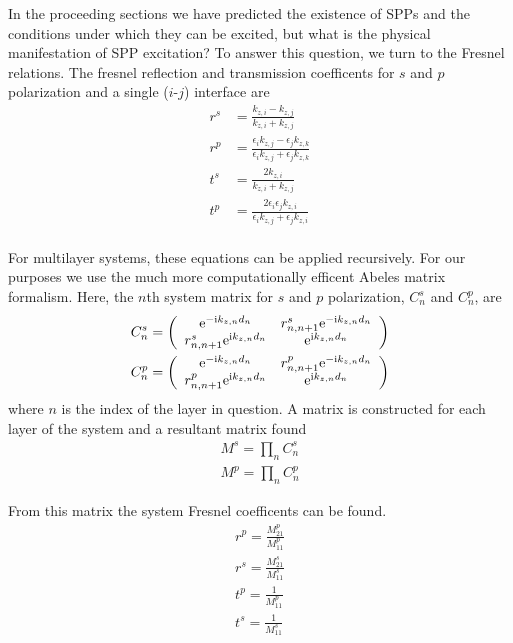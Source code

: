 In the proceeding sections we have predicted the existence of SPPs and the
conditions under which they can be excited, but what is the physical
manifestation of SPP excitation?  To answer this question, we turn to the
Fresnel relations.  The fresnel reflection and transmission coefficents for
$s$ and $p$ polarization and a single ($i$-$j$) interface are
\begin{align}
r^s &= \frac{k_{z,i}-k_{z,j}}{k_{z,i}+k_{z,j}}\\
r^p &= \frac{\epsilon_i k_{z,j} - \epsilon_j k_{z,k}}{\epsilon_i k_{z,j} + \epsilon_j k_{z,k}} \\
t^s &= \frac{2 k_{z,i}}{k_{z,i}+k_{z,j}}\\
t^p &= \frac{2 \epsilon_i \epsilon_j k_{z,i}}{\epsilon_i k_{z,j} + \epsilon_j k_{z,i}}\\
\end{align}

For multilayer systems, these equations can be applied recursively.  For
our purposes we use the much more computationally efficent 
Abeles matrix formalism.  Here, the $n$th system matrix for $s$ and $p$
polarization, $C^s_n$ and $C^p_n$, are
\begin{align}
C^s_n = \left(\begin{array}{cc}
{\mathrm{e}}^{-{\mathrm{i}} k_{z,n} d_n} & r^s_{n,n+1} {\mathrm{e}}^{-{\mathrm{i}} k_{z,n} d_n} \\
r^s_{n,n+1} {\mathrm{e}}^{{\mathrm{i}} k_{z,n} d_n} & {\mathrm{e}}^{{\mathrm{i}} k_{z,n} d_n} 
\end{array}\right)\\
C^p_n = \left(\begin{array}{cc}
{\mathrm{e}}^{-{\mathrm{i}} k_{z,n} d_n} & r^p_{n,n+1} {\mathrm{e}}^{-{\mathrm{i}} k_{z,n} d_n} \\
r^p_{n,n+1} {\mathrm{e}}^{{\mathrm{i}} k_{z,n} d_n} & {\mathrm{e}}^{{\mathrm{i}} k_{z,n} d_n} 
\end{array}\right)
\end{align}
where $n$ is the index of the layer in question.  A matrix is constructed
for each layer of the system and a resultant matrix found
\begin{align}
M^s=\prod_n C^s_n\\
M^p=\prod_n C^p_n
\end{align}

From this matrix the system Fresnel coefficents can be found.
\begin{align}
r^p = \frac{M^p_{21}}{M^p_{11}}\\
r^s = \frac{M^s_{21}}{M^s_{11}}\\
t^p = \frac{1}{M^p_{11}}\\
t^s = \frac{1}{M^s_{11}}\\
\end{align}

